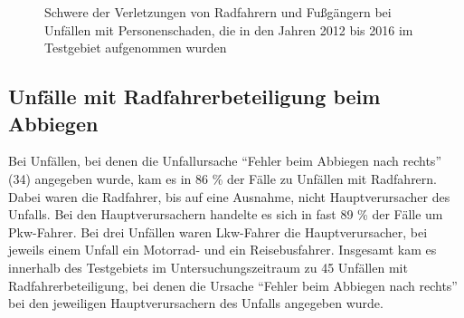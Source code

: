 \begin{savenotes}
	\begin{figure} [H]
		\caption[Schwere der Verletzungen von Radfahrern und Fußgängern bei Unfällen mit Personenschaden, die in den Jahren 2012 bis 2016 im Testgebiet aufgenommen wurden ]{Schwere der Verletzungen von Radfahrern und Fußgängern bei Unfällen mit Personenschaden, die in den Jahren 2012 bis 2016 im Testgebiet aufgenommen wurden}\label{fig:Verletzungsschwere_Rad_Fuss} 
	\end{figure}
\end{savenotes}

\subsection{Unfälle mit Radfahrerbeteiligung beim Abbiegen}\label{subsection:Abbiegeunfälle mit Radfahrern}
Bei Unfällen, bei denen die Unfallursache \enquote{Fehler beim Abbiegen nach rechts} (34) angegeben wurde, kam es in 86 \% der Fälle zu Unfällen mit Radfahrern. Dabei waren die Radfahrer, bis auf eine Ausnahme, nicht Hauptverursacher des Unfalls. Bei den Hauptverursachern handelte es sich in fast 89 \% der Fälle um Pkw-Fahrer. Bei drei Unfällen waren Lkw-Fahrer die Hauptverursacher, bei jeweils einem Unfall ein Motorrad- und ein Reisebusfahrer. Insgesamt kam es innerhalb des Testgebiets im Untersuchungszeitraum zu 45 Unfällen mit Radfahrerbeteiligung, bei denen die Ursache \enquote{Fehler beim Abbiegen nach rechts} bei den jeweiligen Hauptverursachern des Unfalls angegeben wurde.

